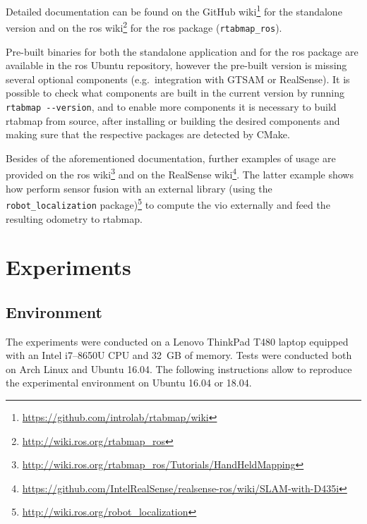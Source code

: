 \documentclass[11pt, letterpaper, twoside]{article}
\begin{document}
Detailed documentation can be found on the GitHub
wiki\footnote{\url{https://github.com/introlab/rtabmap/wiki}} for the
standalone version and on the \gls{ros}
wiki\footnote{\url{http://wiki.ros.org/rtabmap_ros}} for the \gls{ros} package
(\texttt{rtabmap\_ros}).

Pre-built binaries for both the standalone application and for the \gls{ros}
package are available in the \gls{ros} Ubuntu repository, however the pre-built
version is missing several optional components (e.g.~integration with GTSAM or
RealSense). It is possible to check what components are built in the current
version by running \texttt{rtabmap -{}-version}, and to enable more components
it is necessary to build \gls{rtabmap} from source, after installing or
building the desired components and making sure that the respective packages
are detected by CMake.

Besides of the aforementioned documentation, further examples of usage are
provided on the \gls{ros}
wiki\footnote{\url{http://wiki.ros.org/rtabmap_ros/Tutorials/HandHeldMapping}}
and on the RealSense
wiki\footnote{\url{https://github.com/IntelRealSense/realsense-ros/wiki/SLAM-with-D435i}}.
The latter example shows how perform sensor fusion with an external library
(using the \texttt{robot\_localization}
package)\footnote{\url{http://wiki.ros.org/robot_localization}} to compute the
\gls{vio} externally and feed the resulting odometry to \gls{rtabmap}.

\section{Experiments}

\subsection{Environment}

The experiments were conducted on a Lenovo ThinkPad T480 laptop equipped with
an Intel i7--8650U CPU and 32~GB of memory. Tests were conducted both on Arch
Linux and Ubuntu 16.04. The following instructions allow to reproduce the
experimental environment on Ubuntu 16.04 or 18.04.
\end{document}
